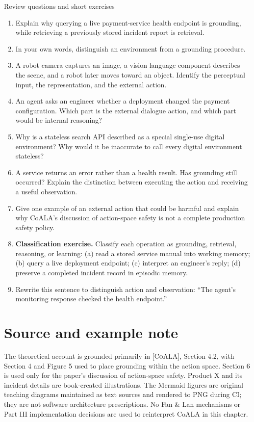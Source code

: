 \begin{reviewquestions}{Review questions and short exercises}
\begin{enumerate}
  \item Explain why querying a live payment-service health endpoint is grounding, while retrieving a previously stored incident report is retrieval.
  \item In your own words, distinguish an environment from a grounding procedure.
  \item A robot camera captures an image, a vision-language component describes the scene, and a robot later moves toward an object. Identify the perceptual input, the representation, and the external action.
  \item An agent asks an engineer whether a deployment changed the payment configuration. Which part is the external dialogue action, and which part would be internal reasoning?
  \item Why is a stateless search API described as a special single-use digital environment? Why would it be inaccurate to call every digital environment stateless?
  \item A service returns an error rather than a health result. Has grounding still occurred? Explain the distinction between executing the action and receiving a useful observation.
  \item Give one example of an external action that could be harmful and explain why CoALA's discussion of action-space safety is not a complete production safety policy.
  \item \textbf{Classification exercise.} Classify each operation as grounding, retrieval, reasoning, or learning: (a) read a stored service manual into working memory; (b) query a live deployment endpoint; (c) interpret an engineer's reply; (d) preserve a completed incident record in episodic memory.
  \item Rewrite this sentence to distinguish action and observation: ``The agent's monitoring response checked the health endpoint.''
\end{enumerate}
\end{reviewquestions}

\section*{Source and example note}
The theoretical account is grounded primarily in \textsc{[CoALA]}, Section 4.2, with Section 4 and Figure 5 used to place grounding within the action space. Section 6 is used only for the paper's discussion of action-space safety. Product X and its incident details are book-created illustrations. The Mermaid figures are original teaching diagrams maintained as text sources and rendered to PNG during CI; they are not software architecture prescriptions. No Fan \& Lan mechanisms or Part III implementation decisions are used to reinterpret CoALA in this chapter.

